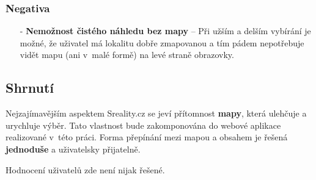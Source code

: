 \subsubsection*{Negativa}
\begin{itemize}
    \item[-] \textbf{Nemožnost čistého náhledu bez mapy} -- Při užším a delším vybírání je možné, že uživatel má lokalitu dobře zmapovanou a tím pádem nepotřebuje vidět mapu (ani v~malé formě) na levé straně obrazovky.
\end{itemize}


\subsection{Shrnutí}
Nejzajímavějším aspektem Sreality.cz se jeví přítomnost \textbf{mapy}, která ulehčuje a urychluje výběr. Tato vlastnost bude zakomponována do webové aplikace realizované v~této práci. Forma přepínání mezi mapou a obsahem je řešená \textbf{jednoduše} a uživatelsky přijatelně.

Hodnocení uživatelů zde není nijak řešené.
